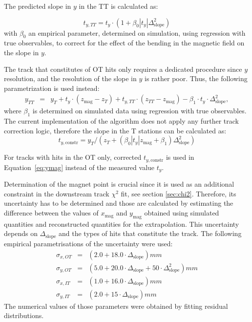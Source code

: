 The predicted slope in $y$ in the TT is calculated as:

\begin{equation}
t_{y,TT} = t_{y} \cdot (1 + \beta_{0} |t_{y}| \Delta_{\text{slope}}^{2})
\end{equation}
with  $\beta_{0}$ an empirical parameter, determined on simulation, 
using regression with true observables, to correct
for the effect of the bending in the magnetic field on the slope in $y$.


The track that constitutes of OT hits only requires a dedicated procedure since $y$ resolution, and the resolution of the slope in $y$ is rather poor. 
Thus, the following parametrization is used instead:
\begin{eqnarray}
y_{TT} & = & y_{T} + t_{y} \cdot (z_{\text{mag}} - z_{T}) + t_{y,TT} \cdot (z_{TT} - z_{\text{mag}}) - \beta_{1} \cdot t_{y} \cdot \Delta_{\text{slope}}^{2},
\end{eqnarray}
where $\beta_{1}$ is determined on simulated data using regression with true observables. 
The current implementation of the algorithm does not apply any further track correction logic, therefore the slope in the T stations can be calculated as:
\begin{equation}
t_{y, \text{constr}} = y_{T} / ( z_{T} + (\beta_{0} |t_{y}| z_{\text{mag}} + \beta_{1} ) \Delta_{\text{slope}}^{2})
\end{equation}

For tracks with hits in the OT only, corrected $t_{y, \text{constr}}$ is used in Equation~\ref{eq:ymag} instead of the measured value $t_{y}$.

Determination of the magnet point is crucial since it is used as an additional constraint in the downstream track $\chi^{2}$ fit, see section \ref{sec:chi2}. Therefore, its uncertainty has to be determined and those are calculated by estimating the difference between the values of $x_{\text{mag}}$ and
$y_{\text{mag}}$ obtained using simulated quantities and reconstructed quantities for the extrapolation. This uncertainty depends on $\Delta_{\text{slope}}$ and the types of hits that constitute the track. 
The following empirical parametrisations of the uncertainty
were used:
\begin{eqnarray}
\sigma_{x, OT} & = & (2.0 + 18.0\cdot \Delta_{\text{slope}})mm \nonumber \\
\sigma_{y, OT} & = & (5.0 + 20.0\cdot \Delta_{\text{slope}} + 50\cdot \Delta_{\text{slope}}^{2})mm  \nonumber \\
\sigma_{x, IT} & = & (1.0 + 16.0\cdot \Delta_{\text{slope}})mm  \nonumber \\
\sigma_{y, IT} & = & (2.0 + 15\cdot \Delta_{\text{slope}})mm  \nonumber
\end{eqnarray}
The numerical values of those parameters were obtained by fitting residual distributions.

